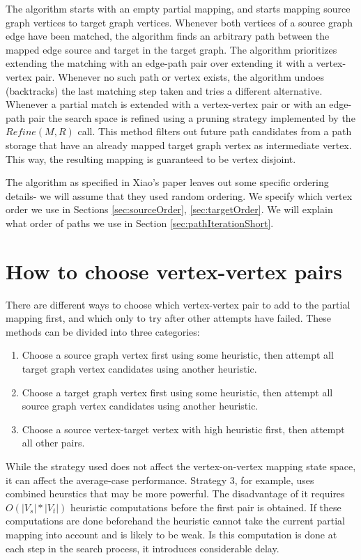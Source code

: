 The algorithm starts with an empty partial mapping, and starts mapping source graph vertices to target graph vertices. Whenever both vertices of a source graph edge have been matched, the algorithm finds an arbitrary path between the mapped edge source and target in the target graph. The algorithm prioritizes extending the matching with an edge-path pair over extending it with a vertex-vertex pair. Whenever no such path or vertex exists, the algorithm undoes (backtracks) the last matching step taken and tries a different alternative. Whenever a partial match is extended with a vertex-vertex pair or with an edge-path pair the search space is refined using a pruning strategy implemented by the $Refine(M,R)$ call. This method filters out future path candidates from a path storage that have an already mapped target graph vertex as intermediate vertex. This way, the resulting mapping is guaranteed to be vertex disjoint.

The algorithm as specified in Xiao's paper leaves out some specific ordering details- we will assume that they used random ordering. We specify which vertex order we use in Sections \ref{sec:sourceOrder}, \ref{sec:targetOrder}. We will explain what order of paths we use in Section \ref{sec:pathIterationShort}.

\section{How to choose vertex-vertex pairs}
There are different ways to choose which vertex-vertex pair to add to the partial mapping first, and which only to try after other attempts have failed. These methods can be divided into three categories:

\begin{enumerate}
\item Choose a source graph vertex first using some heuristic, then attempt all target graph vertex candidates using another heuristic.
\item Choose a target graph vertex first using some heuristic, then attempt all source graph vertex candidates using another heuristic.
\item Choose a source vertex-target vertex with high heuristic first, then attempt all other pairs.
\end{enumerate}

While the strategy used does not affect the vertex-on-vertex mapping state space, it can affect the average-case performance. Strategy 3, for example, uses combined heurstics that may be more powerful. The disadvantage of it requires $O(|V_s|*|V_t|)$ heuristic computations before the first pair is obtained. If these computations are done beforehand the heuristic cannot take the current partial mapping into account and is likely to be weak. Is this computation is done at each step in the search process, it introduces considerable delay.

